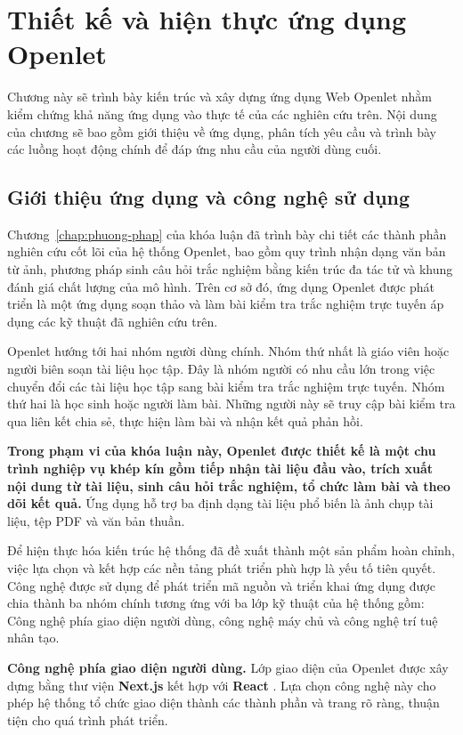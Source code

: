 \chapter{Thiết kế và hiện thực ứng dụng Openlet}
\label{chap:thiet-ke}

Chương này sẽ trình bày kiến trúc và xây dựng ứng dụng Web Openlet nhằm kiểm chứng khả năng ứng dụng vào thực tế của các nghiên cứu trên. Nội dung của chương sẽ bao gồm giới thiệu về ứng dụng, phân tích yêu cầu và trình bày các luồng hoạt động chính để đáp ứng nhu cầu của người dùng cuối.

\section{Giới thiệu ứng dụng và công nghệ sử dụng}

Chương~\ref{chap:phuong-phap} của khóa luận đã trình bày chi tiết các thành phần nghiên cứu cốt lõi của hệ thống Openlet, bao gồm quy trình nhận dạng văn bản từ ảnh, phương pháp sinh câu hỏi trắc nghiệm bằng kiến trúc đa tác tử và khung đánh giá chất lượng của mô hình. Trên cơ sở đó, ứng dụng Openlet được phát triển là một ứng dụng soạn thảo và làm bài kiểm tra trắc nghiệm trực tuyến áp dụng các kỹ thuật đã nghiên cứu trên.

Openlet hướng tới hai nhóm người dùng chính. Nhóm thứ nhất là giáo viên hoặc người biên soạn tài liệu học tập. Đây là nhóm người có nhu cầu lớn trong việc chuyển đổi các tài liệu học tập sang bài kiểm tra trắc nghiệm trực tuyến. Nhóm thứ hai là học sinh hoặc người làm bài. Những người này sẽ truy cập bài kiểm tra qua liên kết chia sẻ, thực hiện làm bài và nhận kết quả phản hồi.

\textbf{Trong phạm vi của khóa luận này, Openlet được thiết kế là một chu trình nghiệp vụ khép kín gồm tiếp nhận tài liệu đầu vào, trích xuất nội dung từ tài liệu, sinh câu hỏi trắc nghiệm, tổ chức làm bài và theo dõi kết quả.} Ứng dụng hỗ trợ ba định dạng tài liệu phổ biến là ảnh chụp tài liệu, tệp PDF và văn bản thuần.

Để hiện thực hóa kiến trúc hệ thống đã đề xuất thành một sản phẩm hoàn chỉnh, việc lựa chọn và kết hợp các nền tảng phát triển phù hợp là yếu tố tiên quyết. Công nghệ được sử dụng để phát triển mã nguồn và triển khai ứng dụng được chia thành ba nhóm chính tương ứng với ba lớp kỹ thuật của hệ thống gồm: Công nghệ phía giao diện người dùng, công nghệ máy chủ và công nghệ trí tuệ nhân tạo.

\textbf{Công nghệ phía giao diện người dùng.} Lớp giao diện của Openlet được xây dựng bằng thư viện \textbf{Next.js} \cite{nextjs} kết hợp với \textbf{React} \cite{reactjs}. Lựa chọn công nghệ này cho phép hệ thống tổ chức giao diện thành các thành phần và trang rõ ràng, thuận tiện cho quá trình phát triển.

